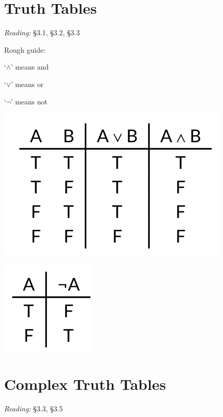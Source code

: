 \documentclass[12pt]{extarticle}
\begin{document}
\begin{multicols*}{3}
 
\section{Truth Tables}
 
\emph{Reading:} §3.1, §3.2, §3.3
 
Rough guide:
 
`$\land{}$' means and
 
`$\lor{}$' means or
 
`$\lnot{}$' means not
 
\begin{center}
\includegraphics[scale=0.3]{img/truth_table_or_and.png}
\end{center}
\begin{center}
\includegraphics[scale=0.3]{img/truth_table_not.png}
\end{center}
 
 
\section{Complex Truth Tables}
 
\emph{Reading:} §3.3, §3.5
 

\end{multicols*}
\end{document}
